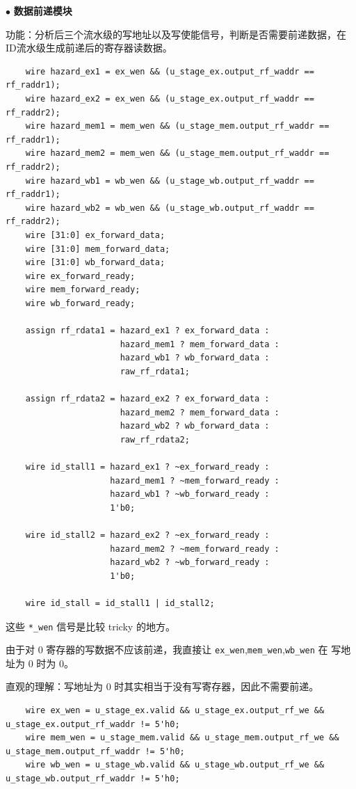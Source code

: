 \documentclass[11pt]{article}
\begin{document}
\noindent $\bullet$
\textbf{数据前递模块}

功能：分析后三个流水级的写地址以及写使能信号，判断是否需要前递数据，在ID流水级生成前递后的寄存器读数据。

\begin{lstlisting}
    wire hazard_ex1 = ex_wen && (u_stage_ex.output_rf_waddr == rf_raddr1);
    wire hazard_ex2 = ex_wen && (u_stage_ex.output_rf_waddr == rf_raddr2);
    wire hazard_mem1 = mem_wen && (u_stage_mem.output_rf_waddr == rf_raddr1);
    wire hazard_mem2 = mem_wen && (u_stage_mem.output_rf_waddr == rf_raddr2);
    wire hazard_wb1 = wb_wen && (u_stage_wb.output_rf_waddr == rf_raddr1);
    wire hazard_wb2 = wb_wen && (u_stage_wb.output_rf_waddr == rf_raddr2);
    wire [31:0] ex_forward_data;
    wire [31:0] mem_forward_data;
    wire [31:0] wb_forward_data;
    wire ex_forward_ready;
    wire mem_forward_ready;
    wire wb_forward_ready;

    assign rf_rdata1 = hazard_ex1 ? ex_forward_data :
                       hazard_mem1 ? mem_forward_data :
                       hazard_wb1 ? wb_forward_data :
                       raw_rf_rdata1;

    assign rf_rdata2 = hazard_ex2 ? ex_forward_data :
                       hazard_mem2 ? mem_forward_data :
                       hazard_wb2 ? wb_forward_data :
                       raw_rf_rdata2;

    wire id_stall1 = hazard_ex1 ? ~ex_forward_ready :
                     hazard_mem1 ? ~mem_forward_ready :
                     hazard_wb1 ? ~wb_forward_ready :
                     1'b0;

    wire id_stall2 = hazard_ex2 ? ~ex_forward_ready :
                     hazard_mem2 ? ~mem_forward_ready :
                     hazard_wb2 ? ~wb_forward_ready :
                     1'b0;

    wire id_stall = id_stall1 | id_stall2;
\end{lstlisting}

这些 \verb|*_wen| 信号是比较 tricky 的地方。

由于对 0 寄存器的写数据不应该前递，我直接让 \verb|ex_wen|,\verb|mem_wen|,\verb|wb_wen| 在 写地址为 0 时为 0。

直观的理解：写地址为 0 时其实相当于没有写寄存器，因此不需要前递。

\begin{lstlisting}
    wire ex_wen = u_stage_ex.valid && u_stage_ex.output_rf_we && u_stage_ex.output_rf_waddr != 5'h0;
    wire mem_wen = u_stage_mem.valid && u_stage_mem.output_rf_we && u_stage_mem.output_rf_waddr != 5'h0;
    wire wb_wen = u_stage_wb.valid && u_stage_wb.output_rf_we && u_stage_wb.output_rf_waddr != 5'h0;
\end{lstlisting}
\end{document}
